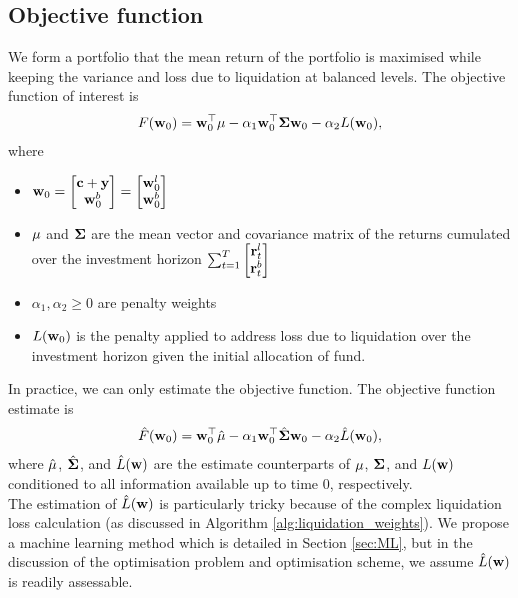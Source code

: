 \documentclass{article} %
\theoremstyle{plain}
\theoremstyle{definition} %
\begin{document}
\subsection{Objective function}
We form a portfolio that the mean return of the portfolio is maximised while keeping the variance and loss due to liquidation at balanced levels.
 The objective function of interest is
 \begin{align}
  F({\bf w}_0) = {\bf w}^\top_0 {\bf \mu} - \alpha_1 {\bf w}^\top_0 {\bf \Sigma}{\bf w}_0 - \alpha_2 L({\bf w}_0),
 \end{align}
 where 
 \begin{itemize}
 \item ${\bf w}_0 = \begin{bmatrix} 
  {\bf c} + {\bf y} \\  {\bf w}^b_0 \end{bmatrix} = \begin{bmatrix} 
  {\bf w}^l_0 \\  {\bf w}^b_0 \end{bmatrix}$
  \item  ${\bf \mu}$ and ${\bf \Sigma}$ are the mean vector and covariance matrix of the returns cumulated over the investment horizon
  $\sum_{t=1}^T \begin{bmatrix}
    {\bf r}^l_t \\ {\bf r}^b_t
    \end{bmatrix}$
  \item $\alpha_1 , \alpha_2 \geq 0$ are penalty weights
  \item $L({\bf w}_0)$ is the penalty applied to address loss due to liquidation over the investment horizon given the initial allocation of fund. 
 \end{itemize}

In practice, we can only estimate the objective function. 
 The objective function estimate is 
 \begin{align}
  \hat F({\bf w}_0) = {\bf w}^\top_0 \hat {\bf \mu} - \alpha_1 {\bf w}^\top_0 \hat {\bf \Sigma}{\bf w}_0 - \alpha_2 \hat L({\bf w}_0),
 \end{align}
 where $\hat {\bf \mu}$, $\hat {\bf \Sigma}$, and $\hat L({\bf w})$ are the estimate counterparts of ${\bf \mu}$, ${\bf \Sigma}$, and $L({\bf w})$ conditioned to all information available up to time $0$, respectively. \\

The estimation of $\hat L({\bf w})$ is particularly tricky because of the complex liquidation loss calculation (as discussed in Algorithm \ref{alg:liquidation_weights}). 
 We propose a machine learning method which is detailed in Section \ref{sec:ML}, 
 but in the discussion of the optimisation problem and optimisation scheme, 
 we assume $\hat L({\bf w})$ is readily assessable. \\
\end{document}
